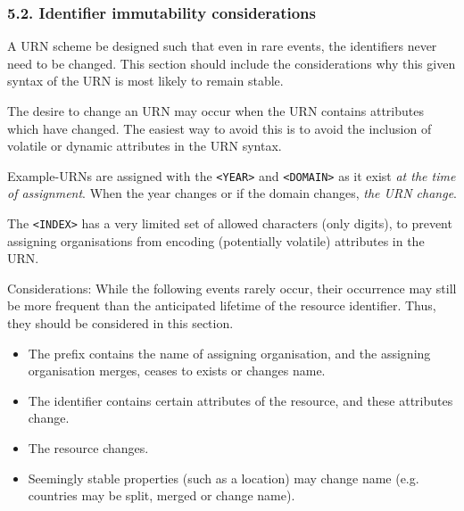 \documentclass[12pt]{article}  %
\begin{document}
\subsubsection*{5.2. Identifier immutability considerations}

A URN scheme \MUST{} be designed such that even in rare events, the identifiers 
never need to be changed. This section should include the considerations why 
this given syntax of the URN is most likely to remain stable.

The desire to change an URN may occur when the URN contains attributes which have 
changed. The easiest way to avoid this is to avoid the inclusion of volatile or 
dynamic attributes in the URN syntax.

\begin{example}
Example-URNs are assigned with the \texttt{<YEAR>} and \texttt{<DOMAIN>} as 
it exist \emph{at the time of assignment}. When the year changes or if the domain 
changes, \emph{the URN \MUSTNOT{} change}.

The \texttt{<INDEX>} has a very limited set of allowed characters (only digits), 
to prevent assigning organisations from encoding (potentially volatile) 
attributes in the URN.
\end{example}

Considerations: 
While the following events rarely occur, their occurrence may still be more 
frequent than the anticipated lifetime of the resource identifier. 
Thus, they should be considered in this section.
\begin{itemize}
    \item The prefix contains the name of assigning organisation, and the 
      assigning organisation merges, ceases to exists or changes name.
    \item The identifier contains certain attributes of the resource, and 
      these attributes change.
    \item The resource changes.
    \item Seemingly stable properties (such as a location) may change name 
      (e.g. countries may be split, merged or change name).
\end{itemize}

\end{document}
